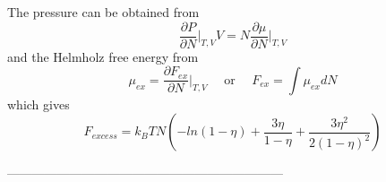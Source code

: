 \documentclass[double,12pt]{beavtex}
\begin{document}
The pressure can be obtained from \color{red}
\begin{equation}{\frac{\partial{P}}{\partial{N}}\bigg|_{T,V}V=N\frac{\partial\mu}{\partial{N}}\bigg|_{T,V}}\end{equation} \color{black}
and the Helmholz free energy from
\begin{displaymath}\mu_{ex}=\frac{\partial{F_{ex}}}{\partial{N}}\bigg|_{T,V}{~~~~~~}\text{or}{~~~~~~}F_{ex}=\int{\mu_{ex}dN}\end{displaymath}
which gives
\begin{equation}F_{excess}=k_BTN\left(-ln(1-\eta)+\frac{3\eta}{1-\eta}+\frac{3{\eta}^2}{2(1-\eta)^2}\right)\end{equation} 

------------------------------------------------------------------
\end{document}
